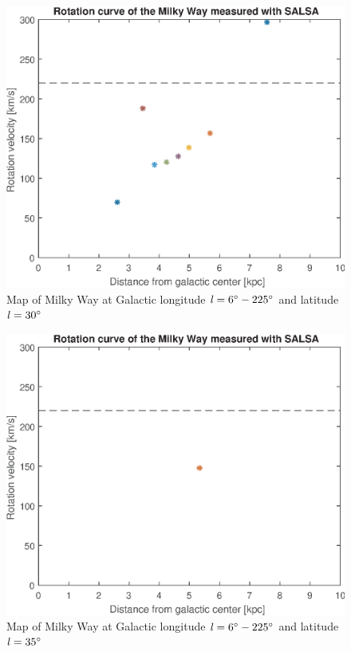 \documentclass[fleqn,usenatbib]{mnras}
\begin{document}
\begin{figure}
      \includegraphics[width=\columnwidth]{RotationCurve_7}
      \caption{Map of Milky Way at Galactic longitude $\mathit{l}=6\hbox{$^\circ$}-225\hbox{$^\circ$}$ and latitude $\mathit{l}=30\hbox{$^\circ$}$}
      \label{fig:rot-7}
\end{figure}

\begin{figure}
      \includegraphics[width=\columnwidth]{RotationCurve_8}
      \caption{Map of Milky Way at Galactic longitude $\mathit{l}=6\hbox{$^\circ$}-225\hbox{$^\circ$}$ and latitude $\mathit{l}=35\hbox{$^\circ$}$}
      \label{fig:rot-8}
\end{figure}
\end{document}
